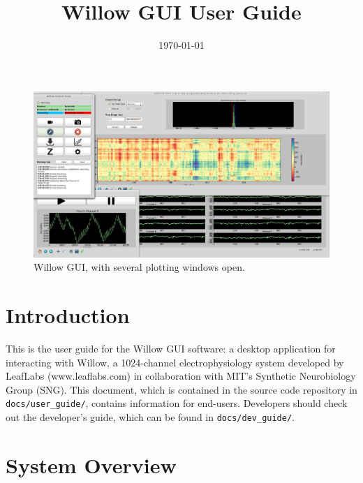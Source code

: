 % 


\usepackage{bm}

\title{Willow GUI User Guide}
\date{\today}


\maketitle


\begin{figure}[h!]
\begin{center}
\includegraphics[width=15cm]{screenshots/gui_windowtiling.png}
\end{center}
\caption{Willow GUI, with several plotting windows open.}
\label{fig_sw}
\end{figure}

\section{Introduction}
\label{sec_intro}

This is the user guide for the Willow GUI software: a desktop application for interacting with Willow, a 1024-channel electrophysiology system developed by LeafLabs (www.leaflabs.com) in collaboration with MIT's Synthetic Neurobiology Group (SNG). This document, which is contained in the source code repository in \texttt{docs/user\_guide/}, contains information for end-users. Developers should check out the developer's guide, which can be found in \texttt{docs/dev\_guide/}.


\section{System Overview}
\label{sec_overview}

